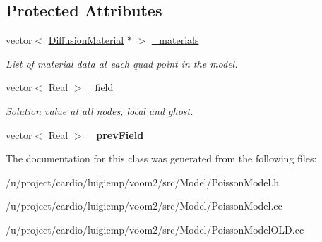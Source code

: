 \subsection*{Protected Attributes}
\begin{DoxyCompactItemize}
\item 
\hypertarget{classvoom_1_1_poisson_model_ae0f6c86849f8dc795a749b14d8189b02}{
vector$<$ \hyperlink{classvoom_1_1_diffusion_material}{DiffusionMaterial} $\ast$ $>$ \hyperlink{classvoom_1_1_poisson_model_ae0f6c86849f8dc795a749b14d8189b02}{\_\-materials}}
\label{classvoom_1_1_poisson_model_ae0f6c86849f8dc795a749b14d8189b02}

\begin{DoxyCompactList}\small\item\em List of material data at each quad point in the model. \item\end{DoxyCompactList}\item 
\hypertarget{classvoom_1_1_poisson_model_af09bf3fbb7500cf5ee7547cd26ee7cb0}{
vector$<$ Real $>$ \hyperlink{classvoom_1_1_poisson_model_af09bf3fbb7500cf5ee7547cd26ee7cb0}{\_\-field}}
\label{classvoom_1_1_poisson_model_af09bf3fbb7500cf5ee7547cd26ee7cb0}

\begin{DoxyCompactList}\small\item\em Solution value at all nodes, local and ghost. \item\end{DoxyCompactList}\item 
\hypertarget{classvoom_1_1_poisson_model_aa69723311e235a2e6904720af3a730a5}{
vector$<$ Real $>$ {\bfseries \_\-prevField}}
\label{classvoom_1_1_poisson_model_aa69723311e235a2e6904720af3a730a5}

\end{DoxyCompactItemize}


The documentation for this class was generated from the following files:\begin{DoxyCompactItemize}
\item 
/u/project/cardio/luigiemp/voom2/src/Model/PoissonModel.h\item 
/u/project/cardio/luigiemp/voom2/src/Model/PoissonModel.cc\item 
/u/project/cardio/luigiemp/voom2/src/Model/PoissonModelOLD.cc\end{DoxyCompactItemize}
